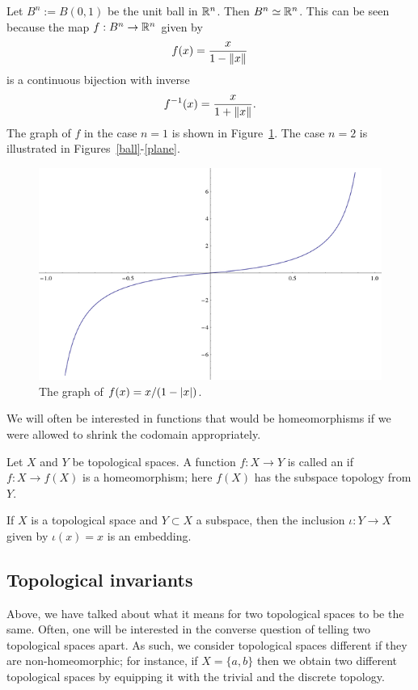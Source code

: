 \begin{example}
  \label{open-ball-homeomorphism}
  Let $B^n := B(0,1)$ be the unit ball in $\mathbb{R}^n$. Then $B^n \simeq \mathbb{R}^n$. This can be seen because the map $f : B^n \to \mathbb{R}^n$ given by
  \[
    f(x) = \frac{x}{1-\lVert x \rVert}
  \]
  is a continuous bijection with inverse
  \[
    f^{-1}(x) = \frac{x}{1+\lVert x \rVert}.
  \]
  The graph of $f$ in the case $n = 1$ is shown in Figure~\ref{homeointerval}. The case $n = 2$ is illustrated in Figures~\ref{ball}-\ref{plane}.
  \begin{figure}
    \centering
    \includegraphics[width=.6\linewidth]{images/homeointerval}
    \caption{The graph of $f(x) = x/(1-\lvert x \rvert)$.}
    \label{homeointerval}
  \end{figure}
\end{example}
We will often be interested in functions that would be homeomorphisms if we were allowed to shrink the codomain appropriately.
\begin{defn}
  Let $X$ and $Y$ be topological spaces. A function $f: X \to Y$ is called an  if $f : X \to f(X)$ is a homeomorphism; here $f(X)$ has the subspace topology from $Y$.
\end{defn}
\begin{example}
  If $X$ is a topological space and $Y \subset X$ a subspace, then the inclusion $\iota : Y \to X$ given by $\iota(x) = x$ is an embedding.
\end{example}

\subsection{Topological invariants}
Above, we have talked about what it means for two topological spaces to be the same. Often, one will be interested in the converse question of telling two topological spaces apart. As such, we consider topological spaces different if they are non-homeomorphic; for instance, if $X = \{a,b\}$ then we obtain two different topological spaces by equipping it with the trivial and the discrete topology.

